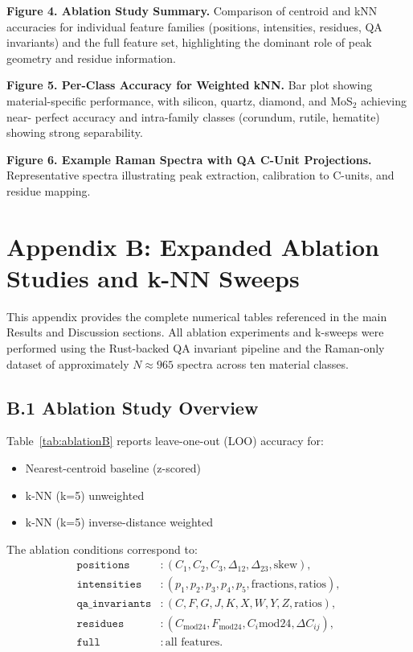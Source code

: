 \documentclass[12pt]{article}
\begin{document}
\noindent\textbf{Figure 4. Ablation Study Summary.}
Comparison of centroid and kNN accuracies for individual feature families (positions, intensities, residues,
QA invariants) and the full feature set, highlighting the dominant role of peak geometry and residue
information.

\noindent\textbf{Figure 5. Per-Class Accuracy for Weighted kNN.}
Bar plot showing material-specific performance, with silicon, quartz, diamond, and MoS$_2$ achieving near-
perfect accuracy and intra-family classes (corundum, rutile, hematite) showing strong separability.

\noindent\textbf{Figure 6. Example Raman Spectra with QA C-Unit Projections.}
Representative spectra illustrating peak extraction, calibration to C-units, and residue mapping.

\section*{Appendix B: Expanded Ablation Studies and k-NN Sweeps}

This appendix provides the complete numerical tables referenced in the main Results and Discussion sections.
All ablation experiments and k-sweeps were performed using the Rust-backed QA invariant pipeline and the
Raman-only dataset of approximately $N \approx 965$ spectra across ten material classes.

\subsection*{B.1 Ablation Study Overview}

Table~\ref{tab:ablationB} reports leave-one-out (LOO) accuracy for:
\begin{itemize}
    \item Nearest-centroid baseline (z-scored)
    \item k-NN (k=5) unweighted
    \item k-NN (k=5) inverse-distance weighted
\end{itemize}

The ablation conditions correspond to:
\begin{align*}
    \texttt{positions} & : (C_1,C_2,C_3,\Delta_{12},\Delta_{23},\text{skew}), \\
    \texttt{intensities} & : (p_1,p_2,p_3,p_4,p_5,\text{fractions},\text{ratios}), \\
    \texttt{qa\_invariants} & : (C,F,G,J,K,X,W,Y,Z,\text{ratios}), \\
    \texttt{residues} & : (C_{\mathrm{mod}24},F_{\mathrm{mod}24},C_i\mathrm{mod}24,\Delta C_{ij}), \\
    \texttt{full} &: \text{all features}.
\end{align*}
\end{document}
